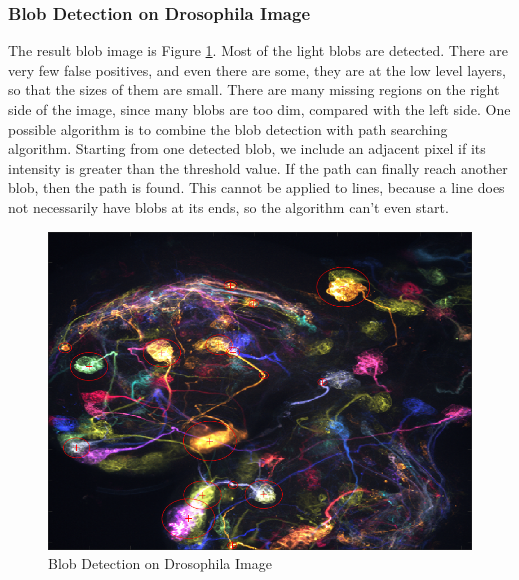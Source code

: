 \subsubsection{Blob Detection on Drosophila Image}
The result blob image is Figure \ref{fig:15}.
Most of the light blobs are detected.
There are very few false positives, and even there are some, they are at the low level layers, so that the sizes of them are small.
There are many missing regions on the right side of the image, since many blobs are too dim, compared with the left side.
One possible algorithm is to combine the blob detection with path searching algorithm.
Starting from one detected blob, we include an adjacent pixel if its intensity is greater than the threshold value.
If the path can finally reach another blob, then the path is found.
This cannot be applied to lines, because a line does not necessarily have blobs at its ends, so the algorithm can't even start.
\begin{figure}
\includegraphics[width=\textwidth]{./hw3/problem1/filterb.png}
\caption{Blob Detection on Drosophila Image}
\label{fig:15}
\end{figure}

